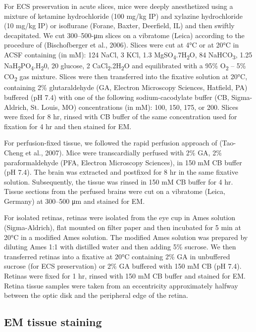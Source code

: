 \documentclass{article}
\begin{document}
For ECS preservation in acute slices, mice were deeply anesthetized using a mixture of ketamine hydrochloride (100 mg/kg IP) and xylazine hydrochloride (10 mg/kg IP) or isoflurane (Forane, Baxter, Deerfield, IL) and then swiftly decapitated. We cut 300–500-μm slices on a vibratome (Leica) according to the procedure of (Bischofberger et al., 2006). Slices were cut at 4°C or at 20°C in ACSF containing (in mM): 124 NaCl, 3 KCl, 1.3 MgSO\textsubscript{4}.7H\textsubscript{2}O, 84 NaHCO\textsubscript{3}, 1.25 NaH\textsubscript{2}PO\textsubscript{4}.H\textsubscript{2}0, 20 glucose, 2 CaCl\textsubscript{2}.2H\textsubscript{2}O and equilibrated with a 95\% O\textsubscript{2} – 5\% CO\textsubscript{2} gas mixture. Slices were then transferred into the fixative solution at 20°C, containing 2\% glutaraldehyde (GA, Electron Microscopy Sciences, Hatfield, PA) buffered (pH 7.4) with one of the following sodium-cacodylate buffer (CB, Sigma-Aldrich, St. Louis, MO) concentrations (in mM): 100, 150, 175, or 200. Slices were fixed for 8 hr, rinsed with CB buffer of the same concentration used for fixation for 4 hr and then stained for EM.

For perfusion-fixed tissue, we followed the rapid perfusion approach of (Tao-Cheng et al., 2007). Mice were transcardially perfused with 2\% GA, 2\% paraformaldehyde (PFA, Electron Microscopy Sciences), in 150 mM CB buffer (pH 7.4). The brain was extracted and postfixed for 8 hr in the same fixative solution. Subsequently, the tissue was rinsed in 150 mM CB buffer for 4 hr. Tissue sections from the perfused brains were cut on a vibratome (Leica, Germany) at 300–500 μm and stained for EM.

For isolated retinas, retinas were isolated from the eye cup in Ames solution (Sigma-Aldrich), flat mounted on filter paper and then incubated for 5 min at 20°C in a modified Ames solution. The modified Ames solution was prepared by diluting Ames 1:1 with distilled water and then adding 5\% sucrose. We then transferred retinas into a fixative at 20°C containing 2\% GA in unbuffered sucrose (for ECS preservation) or 2\% GA buffered with 150 mM CB (pH 7.4). Retinas were fixed for 1 hr, rinsed with 150 mM CB buffer and stained for EM. Retina tissue samples were taken from an eccentricity approximately halfway between the optic disk and the peripheral edge of the retina.

\subsection*{EM tissue staining}
\end{document}
